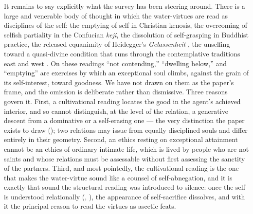 It remains to say explicitly what the survey has been steering around. There is a large and venerable body of thought in which the water-virtues are read as disciplines of the self: the emptying of self in Christian kenosis, the overcoming of selfish partiality in the Confucian \emph{keji}, the dissolution of self-grasping in Buddhist practice, the released equanimity of Heidegger's \emph{Gelassenheit} \parencite{heidegger1962}, the unselfing toward a quasi-divine condition that runs through the contemplative traditions east and west \parencite{nishida1990}. On these readings ``not contending,'' ``dwelling below,'' and ``emptying'' are exercises by which an exceptional soul climbs, against the grain of its self-interest, toward goodness. We have not drawn on them as the paper's frame, and the omission is deliberate rather than dismissive. Three reasons govern it. First, a cultivational reading locates the good in the agent's achieved interior, and so cannot distinguish, at the level of the relation, a generative descent from a dominative or a self-erasing one --- the very distinction the paper exists to draw (); two relations may issue from equally disciplined souls and differ entirely in their geometry. Second, an ethics resting on exceptional attainment cannot be an ethics of ordinary intimate life, which is lived by people who are not saints and whose relations must be assessable without first assessing the sanctity of the partners. Third, and most pointedly, the cultivational reading is the one that makes the water-virtue sound like a counsel of self-abnegation, and it is exactly that sound the structural reading was introduced to silence: once the self is understood relationally (, ), the appearance of self-sacrifice dissolves, and with it the principal reason to read the virtues as ascetic feats.

